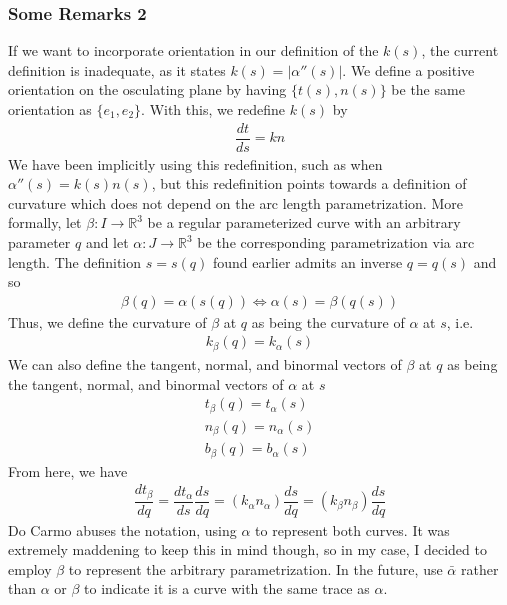 \documentclass{article}
\newcommand{\R}{\mathbb{R}}
\begin{document}
	\subsubsection*{Some Remarks 2}
	If we want to incorporate orientation in our definition of the $k(s)$, the current definition is inadequate, as it states $k(s) = |\alpha''(s)|$. We define a positive orientation on the osculating plane by having $\{ t(s), n(s) \}$ be the same orientation as $\{ e_1, e_2 \}$. With this, we redefine $k(s)$ by	
	\begin{gather*}
		\dfrac{dt}{ds} = kn
	\end{gather*}
	We have been implicitly using this redefinition, such as when $\alpha''(s) = k(s) n(s)$, but this redefinition points towards a definition of curvature which does not depend on the arc length parametrization. More formally, let $\beta : I \to \R^3$ be a regular parameterized curve with an arbitrary parameter $q$ and let $\alpha : J \to \R^3$ be the corresponding parametrization via arc length. The definition $s = s(q)$ found earlier admits an inverse $q = q(s)$ and so
	\begin{gather*}
		\beta(q) = \alpha(s(q)) \iff \alpha(s) = \beta(q(s))
	\end{gather*}
	Thus, we define the curvature of $\beta$ at $q$ as being the curvature of $\alpha$ at $s$, i.e.
	\begin{gather*}
		k_{\beta}(q) = k_{\alpha}(s)
	\end{gather*}
	We can also define the tangent, normal, and binormal vectors of $\beta$ at $q$ as being the tangent, normal, and binormal vectors of $\alpha$ at $s$
	\begin{gather*}
		t_{\beta}(q) = t_{\alpha}(s) \\
		n_{\beta}(q) = n_{\alpha}(s) \\
		b_{\beta}(q) = b_{\alpha}(s)
	\end{gather*}
	From here, we have
	\begin{gather*}
		\dfrac{dt_{\beta}}{dq} = \dfrac{dt_{\alpha}}{ds} \dfrac{ds}{dq}
		= \left( k_{\alpha}n_{\alpha} \right) \dfrac{ds}{dq}
		= \left( k_{\beta}n_{\beta} \right) \dfrac{ds}{dq}
	\end{gather*}
	Do Carmo abuses the notation, using $\alpha$ to represent both curves. It was extremely maddening to keep this in mind though, so in my case, I decided to employ $\beta$ to represent the arbitrary parametrization. In the future, use $\bar{\alpha}$ rather than $\alpha$ or $\beta$ to indicate it is a curve with the same trace as $\alpha$.
	
\end{document}
